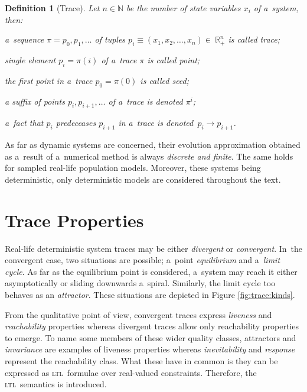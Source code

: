 \documentclass[12pt,twoside,draft]{fithesis}
\newcommand{\ltl}{\textsc{ltl}~}
\newcommand{\mReal}{\mathbb{R}}
\newcommand{\mNatural}{\mathbb{N}}
\newtheorem{mydef}{Definition}
\begin{document}
\begin{mydef}[Trace]
Let $n\in\mNatural$ be the number of state variables $x_i$ of a~system,
then:
\begin{inparaenum}
\item a~sequence $\pi=p_0,p_1,\dotsc$ of tuples
$p_i\equiv(x_1,x_2,\dotsc,x_n)\in~\mReal_{+}^n$ is called trace;
\item single element $p_i=\pi(i)$ of a~trace $\pi$ is called point;
\item the first point in a~trace $p_0=\pi(0)$ is called seed;
\item a suffix of points $p_i,p_{i+1},\dotsc$ of a~trace is
denoted $\pi^i$;
\item a~fact that $p_i$ predeceases $p_{i+1}$ in a~trace is
denoted~$p_i\rightarrow p_{i+1}$.
\end{inparaenum}
\end{mydef}

As far as dynamic systems are concerned, their evolution approximation
obtained as a~result of a~numerical method is always \emph{discrete and
finite}. The same holds for sampled real-life population models.
Moreover, these systems being deterministic\cite{sven}, only
deterministic models are considered throughout the text.

\section{Trace Properties}
Real-life deterministic system traces may be either \emph{divergent} or
\emph{convergent}. In~the convergent case, two situations are possible;
a~point \emph{equilibrium} and a~\emph{limit cycle}. As far as the
equilibrium point is considered, a~system may reach it either
asymptotically or sliding downwards a~spiral. Similarly, the limit
cycle too behaves as an \emph{attractor}. These situations are depicted
in Figure \ref{fig:trace:kinds}.

From the qualitative point of view, convergent traces express
\emph{liveness} and \emph{reachability} properties whereas
divergent traces allow only reachability properties to emerge.
To name some members of these wider quality classes,
attractors and  \emph{invariance} are examples of liveness
properties whereas \emph{inevitability} and \emph{response} represent
the reachability class\cite{rizk}. What these have in common is they
can be expressed as \ltl formulae over real-valued
constraints\cite{sven}. Therefore, the \ltl semantics is introduced.
\end{document}
